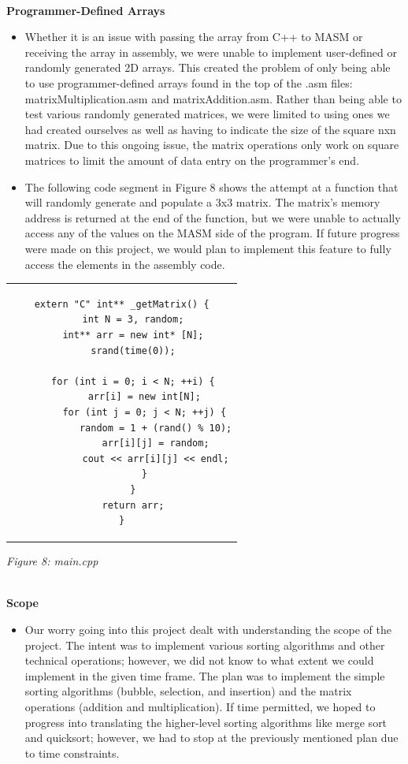 \documentclass[twoside]{article}
\begin{document}
\noindent \\ \textbf{Programmer-Defined Arrays}
\begin{itemize}
\item Whether it is an issue with passing the array from C++ to MASM or receiving the array in assembly, we were unable to implement user-defined or randomly generated 2D arrays. This created the problem of only being able to use programmer-defined arrays found in the top of the .asm files: matrixMultiplication.asm and matrixAddition.asm. Rather than being able to test various randomly generated matrices, we were limited to using ones we had created ourselves as well as having to indicate the size of the square nxn matrix. Due to this ongoing issue, the matrix operations only work on square matrices to limit the amount of data entry on the programmer’s end.
\item The following code segment in Figure 8 shows the attempt at a function that will randomly generate and populate a 3x3 matrix. The matrix’s memory address is returned at the end of the function, but we were unable to actually access any of the values on the MASM side of the program. If future progress were made on this project, we would plan to implement this feature to fully access the elements in the assembly code.
\end{itemize}
\begin{center} \begin{tabular}{c} \begin{lstlisting}
extern "C" int** _getMatrix() {
	int N = 3, random;
	int** arr = new int* [N];
	srand(time(0));

	for (int i = 0; i < N; ++i) {
		arr[i] = new int[N];
		for (int j = 0; j < N; ++j) {
			random = 1 + (rand() % 10);
			arr[i][j] = random;
			cout << arr[i][j] << endl;
		}
	}
	return arr;
}
\end{lstlisting} \end{tabular} \end{center}
\begin{center}\textit{Figure 8: main.cpp}\end{center}

\noindent \\ \textbf{Scope}
\begin{itemize}
\item Our worry going into this project dealt with understanding the scope of the project. The intent was to implement various sorting algorithms and other technical operations; however, we did not know to what extent we could implement in the given time frame. The plan was to implement the simple sorting algorithms (bubble, selection, and insertion) and the matrix operations (addition and multiplication). If time permitted, we hoped to progress into translating the higher-level sorting algorithms like merge sort and quicksort; however, we had to stop at the previously mentioned plan due to time constraints.
\end{itemize}
\end{document}
